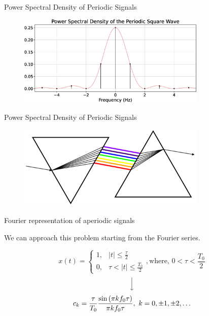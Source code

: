 \documentclass[aspectratio=169]{beamer}
\def\lp{\ensuremath\left(}
\def\rp{\ensuremath\right)}
\begin{document}
\begin{frame}[t]{Power Spectral Density of Periodic Signals}

\begin{figure}
\includegraphics[width=0.8\textwidth]{img/fs-sqwave-psd.eps}
\end{figure}
\end{frame}


\begin{frame}{Power Spectral Density of Periodic Signals}
  \begin{figure}
  \includegraphics[width=0.8\textwidth]{img/decomp.png}
  \end{figure}
\end{frame}


\begin{frame}{Fourier representation of aperiodic signals}

We can approach this problem starting from the Fourier series.

\[ x(t) = \begin{cases}
1, & \vert t \vert \leq \frac{\tau}{2} \\
0, & \tau < \vert t \vert \leq \frac{T_0}{2} 
\end{cases}, \text{where, } 0 < \tau < \frac{T_0}{2} \]
\[ \Big\downarrow \]
\[ c_k = \frac{\tau}{T_0} \frac{\sin\lp \pi k f_0 \tau\rp}{\pi k f_0 \tau}, \,\, k = 0, \pm 1 , \pm 2, \ldots \]

\end{frame}
\end{document}

